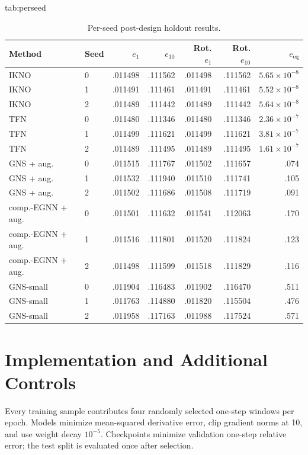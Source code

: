 \documentclass[mlmain]{jmlr}
\newcommand{\IKNO}{\textsc{IKNO}}
\begin{document}
\begin{table}[ht]
\floatconts
{tab:perseed}
{\caption{Per-seed post-design holdout results.}}
{\scriptsize\renewcommand{\arraystretch}{0.86}\begin{tabular}{llrrrrr}
\toprule
Method & Seed & $e_1$ & $e_{10}$ & Rot. $e_1$ & Rot. $e_{10}$ & $e_{\mathrm{eq}}$\\
\midrule
\IKNO{} & 0 & .011498 & .111562 & .011498 & .111562 & $5.65\times10^{-8}$\\
\IKNO{} & 1 & .011491 & .111461 & .011491 & .111461 & $5.52\times10^{-8}$\\
\IKNO{} & 2 & .011489 & .111442 & .011489 & .111442 & $5.64\times10^{-8}$\\
\midrule
TFN & 0 & .011480 & .111346 & .011480 & .111346 & $2.36\times10^{-7}$\\
TFN & 1 & .011499 & .111621 & .011499 & .111621 & $3.81\times10^{-7}$\\
TFN & 2 & .011489 & .111495 & .011489 & .111495 & $1.61\times10^{-7}$\\
\midrule
GNS + aug. & 0 & .011515 & .111767 & .011502 & .111657 & .074\\
GNS + aug. & 1 & .011532 & .111940 & .011510 & .111741 & .105\\
GNS + aug. & 2 & .011502 & .111686 & .011508 & .111719 & .091\\
\midrule
comp.-EGNN + aug. & 0 & .011501 & .111632 & .011541 & .112063 & .170\\
comp.-EGNN + aug. & 1 & .011516 & .111801 & .011520 & .111824 & .123\\
comp.-EGNN + aug. & 2 & .011498 & .111599 & .011518 & .111829 & .116\\
\midrule
GNS-small & 0 & .011904 & .116483 & .011902 & .116470 & .511\\
GNS-small & 1 & .011763 & .114880 & .011820 & .115504 & .476\\
GNS-small & 2 & .011958 & .117163 & .011988 & .117524 & .571\\
\bottomrule
\end{tabular}}
\end{table}

\FloatBarrier

\section{Implementation and Additional Controls}
\label{app:details}

Every training sample contributes four randomly selected one-step windows per
epoch. Models minimize mean-squared derivative error, clip gradient norms at
10, and use weight decay $10^{-5}$. Checkpoints minimize validation one-step
relative error; the test split is evaluated once after selection.
\end{document}
